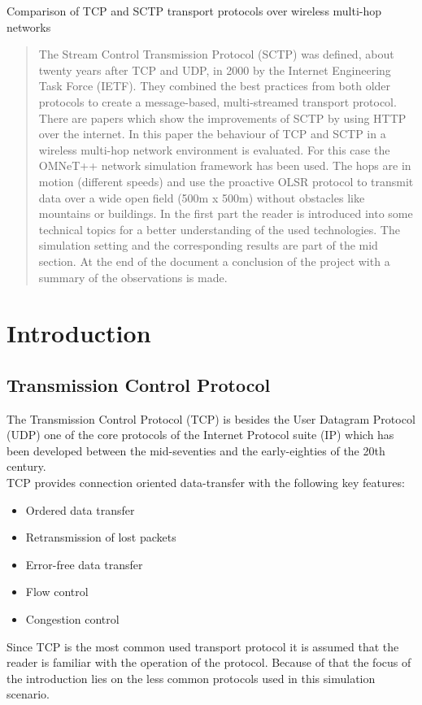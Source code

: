\documentclass[a4paper]{article}
\begin{document}
 
 

\begin{center}
	\huge{Comparison of TCP and SCTP transport protocols over wireless multi-hop networks}
\end{center}

\begin{abstract}
The Stream Control Transmission Protocol (SCTP) was defined, about twenty years after TCP and UDP, in 2000 by the Internet Engineering Task Force (IETF). They combined the best practices from both older protocols to create a message-based, multi-streamed transport protocol. There are papers \cite{sctp_vs_tcp}\cite{sctp_vs_tcp2} which show the improvements of SCTP by using HTTP over the internet. In this paper the behaviour of TCP and SCTP in a wireless multi-hop network environment is evaluated. For this case the OMNeT++ network simulation framework \cite{omnetpp} has been used. The hops are in motion (different speeds) and use the proactive OLSR protocol to transmit data over a wide open field (500m x 500m) without obstacles like mountains or buildings. In the first part the reader is introduced into some technical topics for a better understanding of the used technologies. The simulation setting and the corresponding results are part of the mid section. At the end of the document a conclusion of the project with a summary of the observations is made.
\end{abstract}

\tableofcontents
\pagebreak

\section{Introduction}

\subsection{Transmission Control Protocol}

The Transmission Control Protocol (TCP) is besides the User Datagram Protocol (UDP) one of the core protocols of the Internet Protocol suite (IP) which has been developed between the mid-seventies and the early-eighties of the 20th century.\\
TCP provides connection oriented data-transfer with the following key features:
\begin{itemize}
	\item Ordered data transfer
	\item Retransmission of lost packets
	\item Error-free data transfer 
	\item Flow control 
	\item Congestion control
\end{itemize}
Since TCP is the most common used transport protocol it is assumed that the reader is familiar with the operation of the protocol. Because of that the focus of the introduction lies on the less common protocols used in this simulation scenario.
\end{document}
